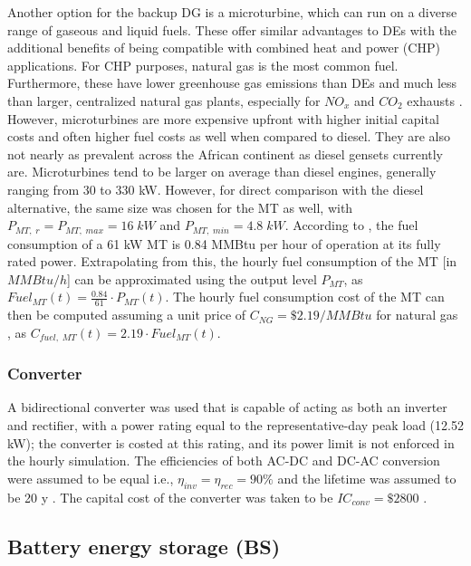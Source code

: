 \documentclass[final,3p,times]{elsarticle}
\begin{document}
Another option for the backup DG is a microturbine, which can run on a diverse range of gaseous and liquid fuels. These offer similar advantages to DEs with the additional benefits of being compatible with combined heat and power (CHP) applications. For CHP purposes, natural gas is the most common fuel. Furthermore, these have lower greenhouse gas emissions than DEs and much less than larger, centralized natural gas plants, especially for $NO_x$ and $CO_2$ exhausts \cite{wu2014}. However, microturbines are more expensive upfront with higher initial capital costs and often higher fuel costs as well when compared to diesel. They are also not nearly as prevalent across the African continent as diesel gensets currently are. Microturbines tend to be larger on average than diesel engines, generally ranging from 30 to 330 kW. However, for direct comparison with the diesel alternative, the same size was chosen for the MT as well, with $P_{MT,\; r} = P_{MT, \; max} = 16 \; kW$ and $P_{MT,\;min} = 4.8 \; kW$. According to \cite{chp_mt}, the fuel consumption of a 61 kW MT is 0.84 MMBtu per hour of operation at its fully rated power. Extrapolating from this, the hourly fuel consumption of the MT [in $MMBtu/h$] can be approximated using the output level $P_{MT}$, as $Fuel_{MT}(t) = \frac{0.84}{61} \cdot P_{MT}(t)$. The hourly fuel consumption cost of the MT can then be computed assuming a unit price of $C_{NG} = \$ 2.19/MMBtu$ for natural gas \cite{ng_price}, as $C_{fuel,\;MT}(t) = 2.19 \cdot Fuel_{MT}(t)$.

\subsubsection{Converter}

A bidirectional converter was used that is capable of acting as both an inverter and rectifier, with a power rating equal to the representative-day peak load (12.52 kW); the converter is costed at this rating, and its power limit is not enforced in the hourly simulation. The efficiencies of both AC-DC and DC-AC conversion were assumed to be equal i.e., $\eta_{inv} = \eta_{rec} = 90\%$ \cite{ogunjuyigbe2016} and the lifetime was assumed to be 20 y \cite{moshi2016}. The capital cost of the converter was taken to be $IC_{conv} = \$2800$ \cite{conv_price}.

\subsection{Battery energy storage (BS) \label{sec:BS}}
\end{document}
